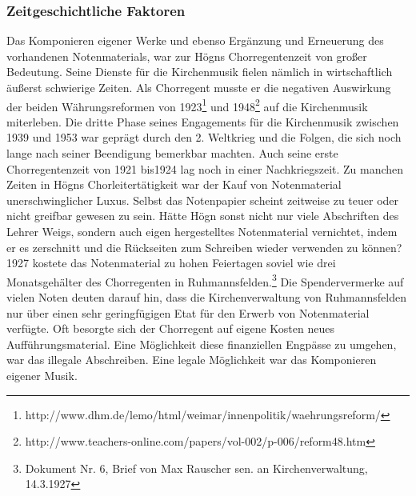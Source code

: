 \documentclass[a4paper]{article}
\begin{document}
\subsubsection{Zeitgeschichtliche Faktoren}
\hypertarget{RefHeadingToc100333746}{}Das Komponieren eigener Werke und
ebenso Ergänzung und Erneuerung des vorhandenen Notenmaterials, war zur
Högns Chorregentenzeit von großer Bedeutung. Seine Dienste für die
Kirchenmusik fielen nämlich in wirtschaftlich äußerst schwierige
Zeiten. Als Chorregent musste er die negativen Auswirkung der beiden
Währungsreformen von 1923\footnote{
http://www.dhm.de/lemo/html/weimar/innenpolitik/waehrungsreform/} und
1948\footnote{
http://www.teachers-online.com/papers/vol-002/p-006/reform48.htm} auf
die Kirchenmusik miterleben. Die dritte Phase seines Engagements für
die Kirchenmusik zwischen 1939 und 1953 war geprägt durch den 2.
Weltkrieg und die Folgen, die sich noch lange nach seiner Beendigung
bemerkbar machten. Auch seine erste Chorregentenzeit von 1921 bis1924
lag noch in einer Nachkriegszeit. Zu manchen Zeiten in Högns
Chorleitertätigkeit war der Kauf von Notenmaterial unerschwinglicher
Luxus. Selbst das Notenpapier scheint zeitweise zu teuer oder nicht
greifbar gewesen zu sein. Hätte Högn sonst nicht nur viele Abschriften
des Lehrer Weigs, sondern auch eigen hergestelltes Notenmaterial
vernichtet, indem er es zerschnitt und die Rückseiten zum Schreiben
wieder verwenden zu können? 1927 kostete das Notenmaterial zu hohen
Feiertagen soviel wie drei Monatsgehälter des Chorregenten in
Ruhmannsfelden.\footnote{ Dokument Nr. 6, Brief von Max Rauscher sen.
an Kirchenverwaltung, 14.3.1927} Die Spendervermerke auf vielen Noten
deuten darauf hin, dass die Kirchenverwaltung von Ruhmannsfelden nur
über einen sehr geringfügigen Etat für den Erwerb von Notenmaterial
verfügte. Oft besorgte sich der Chorregent auf eigene Kosten neues
Aufführungsmaterial. Eine Möglichkeit diese finanziellen Engpässe zu
umgehen, war das illegale Abschreiben. Eine legale Möglichkeit war das
Komponieren eigener Musik. 
\end{document}
